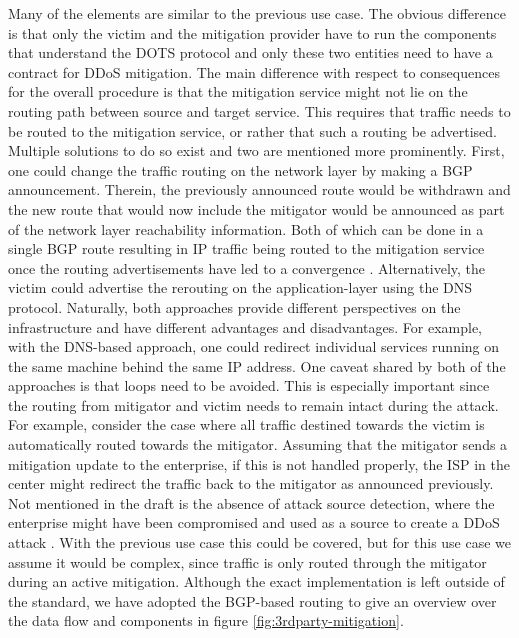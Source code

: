 Many of the elements are similar to the previous use case. The obvious difference is that only the victim and the mitigation provider have to run the components that understand the DOTS protocol and only these two entities need to have a contract for DDoS mitigation. The main difference with respect to consequences for the overall procedure is that the mitigation service might not lie on the routing path between source and target service. This requires that traffic needs to be routed to the mitigation service, or rather that such a routing be advertised. Multiple solutions to do so exist and two are mentioned more prominently. First, one could change the traffic routing on the network layer by making a BGP announcement. Therein, the previously announced route would be withdrawn and the new route that would now include the mitigator would be announced as part of the network layer reachability information. Both of which can be done in a single BGP route resulting in IP traffic being routed to the mitigation service once the routing advertisements have led to a convergence \cite{bgprouting}. Alternatively, the victim could advertise the rerouting on the application-layer using the DNS protocol. Naturally, both approaches provide different perspectives on the infrastructure and have different advantages and disadvantages. For example, with the DNS-based approach, one could redirect individual services running on the same machine behind the same IP address. One caveat shared by both of the approaches is that loops need to be avoided. This is especially important since the routing from mitigator and victim needs to remain intact during the attack. For example, consider the case where all traffic destined towards the victim is automatically routed towards the mitigator. Assuming that the mitigator sends a mitigation update to the enterprise, if this is not handled properly, the ISP in the center might redirect the traffic back to the mitigator as announced previously. Not mentioned in the draft is the absence of attack source detection, where the enterprise might have been compromised and used as a source to create a DDoS attack \cite{dots-use-cases}. With the previous use case this could be covered, but for this use case we assume it would be complex, since traffic is only routed through the mitigator during an active mitigation. Although the exact implementation is left outside of the standard, we have adopted the BGP-based routing to give an overview over the data flow and components in figure \ref{fig:3rdparty-mitigation}.

